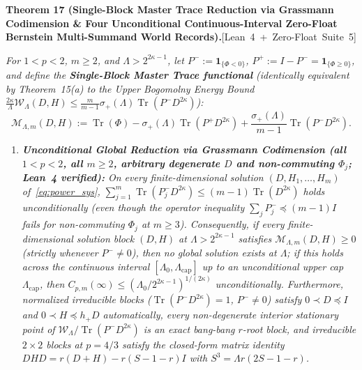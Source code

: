 \documentclass[10pt,letterpaper]{article}
\newcommand{\leanbadge}[1]{\mbox{\sffamily\scriptsize\color{leanborder}[#1]}}
\newcommand{\Tr}{\operatorname{Tr}}
\begin{document}
\begin{tcolorbox}[mathbox]
\textbf{Theorem 17 (Single-Block Master Trace Reduction via Grassmann Codimension \& Four Unconditional Continuous-Interval Zero-Float Bernstein Multi-Summand World Records).}\hfill\leanbadge{Lean~4 + Zero-Float Suite~5}\par\vspace{1.5pt}
\emph{For $1 < p < 2$, $m \ge 2$, and $\Lambda > 2^{2\kappa-1}$, let $P^- := \mathbf{1}_{\{\Phi < 0\}}$, $P^+ := I - P^- = \mathbf{1}_{\{\Phi \ge 0\}}$, and define the \textbf{Single-Block Master Trace functional} (identically equivalent by Theorem~15(a) to the Upper Bogomolny Energy Bound $\frac{2\kappa}{\Lambda}\mathcal{W}_\Lambda(D,H) \le \frac{m}{m-1}\sigma_+(\Lambda)\Tr(P^- D^{2\kappa})$):}
\begin{equation}\label{eq:master_trace}
  \mathcal{M}_{\Lambda, m}(D, H) := \Tr(\Phi) - \sigma_+(\Lambda)\Tr(P^+ D^{2\kappa}) + \frac{\sigma_+(\Lambda)}{m - 1}\Tr(P^- D^{2\kappa}).
\end{equation}
\begin{enumerate}[label=(\alph*),leftmargin=1.8em,itemsep=2pt,topsep=2pt]
  \item \emph{\textbf{Unconditional Global Reduction via Grassmann Codimension (all $1 < p < 2$, all $m \ge 2$, arbitrary degenerate $D$ and non-commuting $\Phi_j$; Lean~4 verified):} On every finite-dimensional solution $(D, H_1,\dots,H_m)$ of~\eqref{eq:power_sys}, $\sum_{j=1}^m \Tr(P_j^- D^{2\kappa}) \le (m - 1)\Tr(D^{2\kappa})$ holds unconditionally (even though the operator inequality $\sum_j P_j^- \preceq (m-1)I$ fails for non-commuting $\Phi_j$ at $m \ge 3$). Consequently, if every finite-dimensional solution block $(D, H)$ at $\Lambda > 2^{2\kappa-1}$ satisfies $\mathcal{M}_{\Lambda, m}(D, H) \ge 0$ (strictly whenever $P^- \neq 0$), then no global solution exists at $\Lambda$; if this holds across the continuous interval $[\Lambda_0, \Lambda_{\mathrm{cap}}]$ up to an unconditional upper cap $\Lambda_{\mathrm{cap}}$, then $C_{p,m}(\infty) \le (\Lambda_0 / 2^{2\kappa-1})^{1/(2\kappa)}$ unconditionally. Furthermore, normalized irreducible blocks ($\Tr(P^- D^{2\kappa}) = 1$, $P^- \neq 0$) satisfy $0 \prec D \preceq I$ and $0 \prec H \preceq h_+ D$ automatically, every non-degenerate interior stationary point of $\mathcal{W}_\Lambda / \Tr(P^- D^{2\kappa})$ is an exact bang-bang $r$-root block, and irreducible $2\times 2$ blocks at $p = 4/3$ satisfy the closed-form matrix identity $D H D = r(D + H) - r(S - 1 - r)I$ with $S^3 = \Lambda r(2S - 1 - r)$.}

\end{enumerate}
\end{tcolorbox}
\end{document}
